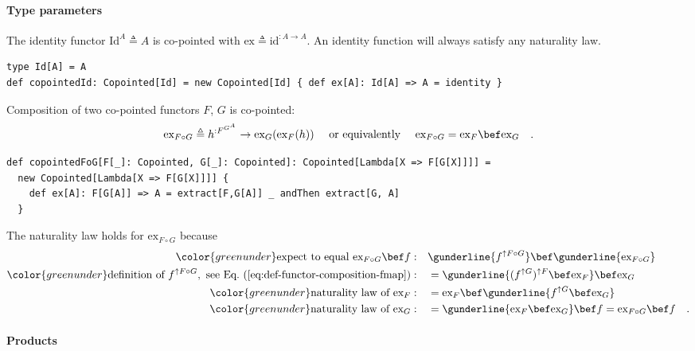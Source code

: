 \paragraph{Type parameters}

The identity functor $\text{Id}^{A}\triangleq A$ is co-pointed with
$\text{ex}\triangleq\text{id}^{:A\rightarrow A}$. An identity function
will always satisfy any naturality law.
\begin{lstlisting}
type Id[A] = A
def copointedId: Copointed[Id] = new Copointed[Id] { def ex[A]: Id[A] => A = identity }
\end{lstlisting}

Composition of two co-pointed functors $F$, $G$ is co-pointed:
\[
\text{ex}_{F\circ G}\triangleq h^{:F^{G^{A}}}\rightarrow\text{ex}_{G}(\text{ex}_{F}(h))\quad\text{ or equivalently }\quad\text{ex}_{F\circ G}=\text{ex}_{F}\bef\text{ex}_{G}\quad.
\]
\begin{lstlisting}
def copointedFoG[F[_]: Copointed, G[_]: Copointed]: Copointed[Lambda[X => F[G[X]]]] =     
  new Copointed[Lambda[X => F[G[X]]]] {
    def ex[A]: F[G[A]] => A = extract[F,G[A]] _ andThen extract[G, A]
  }
\end{lstlisting}
The naturality law holds for $\text{ex}_{F\circ G}$ because
\begin{align*}
{\color{greenunder}\text{expect to equal }\text{ex}_{F\circ G}\bef f:}\quad & \gunderline{f^{\uparrow F\circ G}}\bef\gunderline{\text{ex}_{F\circ G}}\\
{\color{greenunder}\text{definition of }\ensuremath{f^{\uparrow F\circ G}},\text{ see Eq.~(\ref{eq:def-functor-composition-fmap})}:}\quad & =\gunderline{(f^{\uparrow G})^{\uparrow F}\bef\text{ex}_{F}}\bef\text{ex}_{G}\\
{\color{greenunder}\text{naturality law of }\text{ex}_{F}:}\quad & =\text{ex}_{F}\bef\gunderline{f^{\uparrow G}\bef\text{ex}_{G}}\\
{\color{greenunder}\text{naturality law of }\text{ex}_{G}:}\quad & =\gunderline{\text{ex}_{F}\bef\text{ex}_{G}}\bef f=\text{ex}_{F\circ G}\bef f\quad.
\end{align*}


\paragraph{Products}

